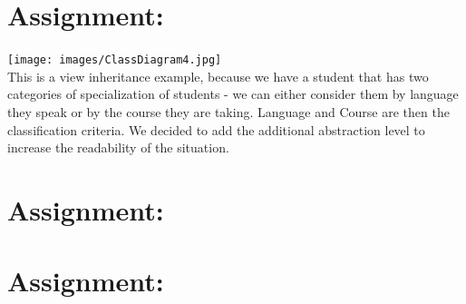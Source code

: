 \documentclass[a4paper,12pt,oneside]{scrreprt}
\begin{document}
	\section{Assignment:}
		\texttt{[image: images/ClassDiagram4.jpg]}\\
		This is a view inheritance example, because we have a student that has two categories of specialization of students - we can either consider them by language they speak or by the course they are taking.
		Language and Course are then the classification criteria. We decided to add the additional abstraction level to increase the readability of the situation.
	\section{Assignment:}
		
	\section{Assignment:}
	\section{}
	
	\section{}
	
\end{document}
